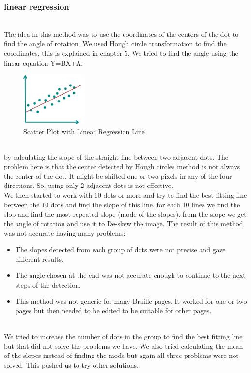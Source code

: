  \subsubsection{linear regression}
 \\
The idea in this method was to use the coordinates of the centers of the dot to find the angle of rotation. We used Hough circle transformation to find the coordinates, this is explained in chapter 5. We tried to find the angle using the linear equation Y=BX+A.
\begin{figure}[h!]
     \centering
        \includegraphics[width=0.3\textwidth]{Linear_regression_assumption_linearity.png}
        \caption{Scatter Plot with Linear Regression Line}
        \label{Scatter Plot with Linear Regression Line}
\end{figure}\\
 by calculating the slope of the straight line between two adjacent dots. The problem here is that the center detected by Hough circles method is not always the center of the dot. It might be shifted one or two pixels in any of the four directions. So, using only 2 adjacent dots is not effective.\\
 \quad We then started to work with 10 dots or more and try to find the best fitting line between the 10 dots and find the slope of this line.  for each 10 lines we find the slop and find the most repeated slope (mode of the slopes). from the slope we get the angle of rotation and use it to De-skew the image.
 The result of this method was not accurate having many problems:\\
 \begin{itemize}
    \item The slopes detected from each group of dots were not precise and gave different results.
    \item The angle chosen at the end was not accurate enough to continue to the next steps of the detection.
    \item This method was not generic for many Braille pages. It worked for one or two pages but then needed to be edited to be suitable for other pages.
\end{itemize}\\
\quad We tried to increase the number of dots in the group to find the best fitting line but that did not solve the problems we have. We also tried calculating the mean of the slopes instead of finding the mode but again all three problems were not solved. This pushed us to try other solutions.

